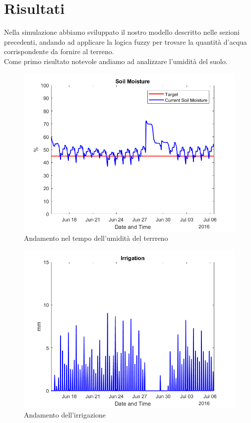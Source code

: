 \documentclass[conference,10pt]{IEEEtran}
\begin{document}
\section{Risultati}\label{sec:res}
Nella simulazione abbiamo sviluppato il nostro modello descritto nelle sezioni precedenti, andando ad applicare la logica fuzzy per trovare la quantità d'acqua corrispondente da fornire al terreno.\\
Come primo risultato notevole andiamo ad analizzare l'umidità del suolo. 
\begin{figure}[ht]
	\centering
	\includegraphics[width=0.9\linewidth]{images/soil_moisture.png}
	\caption{Andamento nel tempo dell'umidità del terrreno}
	\label{fig:MAD}
\end{figure}
\begin{figure}[ht]
	\centering
	\includegraphics[width=0.9\linewidth]{images/irrigation.png}
	\caption{Andamento dell'irrigazione}
	\label{fig:MAD}
\end{figure}
\end{document}
